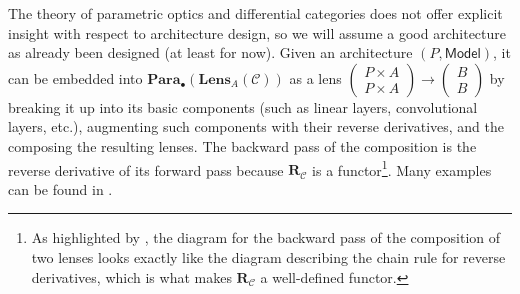 \documentclass[11pt,a4paper,openright,twoside]{report}
\theoremstyle{plain}
\theoremstyle{definition}
\begin{document}
The theory of parametric optics and differential categories does not offer explicit insight with respect to architecture design, so we will assume a good architecture as already been designed (at least for now). Given an architecture $(P,\mathsf{Model})$, it can be embedded into $\mathbf{Para}_{\bullet}(\mathbf{Lens}_A(\mathcal{C}))$ as a lens $\left(\begin{smallmatrix} P \times A \\ P \times A \end{smallmatrix}\right) \to \left(\begin{smallmatrix} B \\ B \end{smallmatrix}\right)$ by breaking it up into its basic components (such as linear layers, convolutional layers, etc.), augmenting such components with their reverse derivatives, and the composing the resulting lenses. The backward pass of the composition is the reverse derivative of its forward pass because $\mathbf{R}_{\mathcal{C}}$ is a functor\footnote{As highlighted by \cite{shiebler2021category}, the diagram for the backward pass of the composition of two lenses looks exactly like the diagram describing the chain rule for reverse derivatives, which is what makes $\mathbf{R}_{\mathcal{C}}$ a well-defined functor.}. Many examples can be found in \cite{cruttwell2022categorical}.
\end{document}
